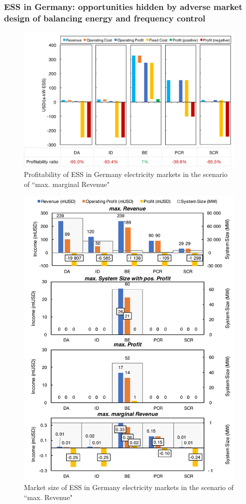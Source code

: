 \subsubsection{ESS in Germany: opportunities hidden by adverse market design of balancing energy and frequency control}

\begin{figure}[h!]
	\centering
	\includegraphics[width=0.9\linewidth]{Figures/Germany_ESS_profitability}
	\caption{Profitability of ESS in Germany electricity markets in the scenario of ``max. marginal Revenue"}
	\label{fig:germany-ess-profitability}
\end{figure}

\begin{figure}[h!]
	\centering
	\includegraphics[width=0.9\linewidth]{Figures/Germany_ESS}
	\caption{Market size of ESS in Germany electricity markets in the scenario of ``max. Revenue"}
	\label{fig:germany-ess}
\end{figure}

